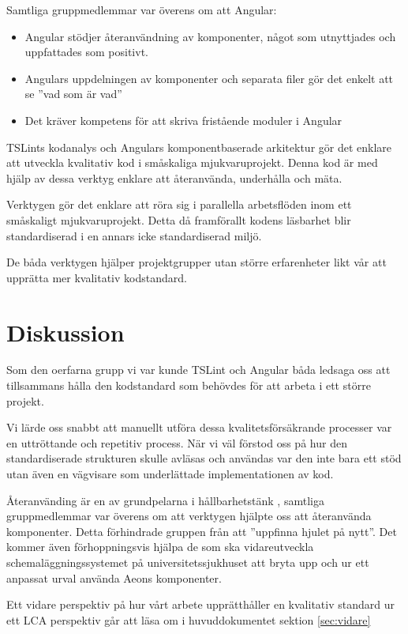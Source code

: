 Samtliga gruppmedlemmar var överens om att Angular:

\begin{itemize}
	\item Angular stödjer återanvändning av komponenter, något som utnyttjades och uppfattades som positivt.
	\item Angulars uppdelningen av komponenter och separata filer gör det enkelt att se ''vad som är vad''
	\item Det kräver kompetens för att skriva fristående moduler i Angular
\end{itemize}

TSLints kodanalys och Angulars komponentbaserade arkitektur gör det enklare att utveckla kvalitativ kod i småskaliga mjukvaruprojekt. Denna kod är med hjälp av dessa verktyg enklare att återanvända, underhålla och mäta.

Verktygen gör det enklare att röra sig i parallella arbetsflöden inom ett småskaligt mjukvaruprojekt. Detta då framförallt kodens läsbarhet blir standardiserad i en annars icke standardiserad miljö.

De båda verktygen hjälper projektgrupper utan större erfarenheter likt vår att upprätta mer kvalitativ kodstandard.

\section{Diskussion}

Som den oerfarna  grupp vi var kunde TSLint och Angular båda ledsaga oss att tillsammans hålla den kodstandard som behövdes för att arbeta i ett större projekt.

Vi lärde oss snabbt att manuellt utföra dessa kvalitetsförsäkrande processer var en uttröttande och repetitiv process. När vi väl förstod oss på hur den standardiserade strukturen skulle avläsas och användas var den inte bara ett stöd utan även en vägvisare som underlättade implementationen av kod.

Återanvänding är en av grundpelarna i hållbarhetstänk \cite{sustainable}, samtliga gruppmedlemmar var överens om att verktygen hjälpte oss att återanvända komponenter. Detta förhindrade gruppen från att ''uppfinna hjulet på nytt''. Det kommer även förhoppningsvis hjälpa de som ska vidareutveckla schemaläggningssystemet på universitetssjukhuset att bryta upp och ur ett anpassat urval använda Aeons komponenter.



Ett vidare perspektiv på hur vårt arbete upprätthåller en kvalitativ standard ur ett LCA perspektiv går att läsa om i huvuddokumentet sektion \ref{sec:vidare}

